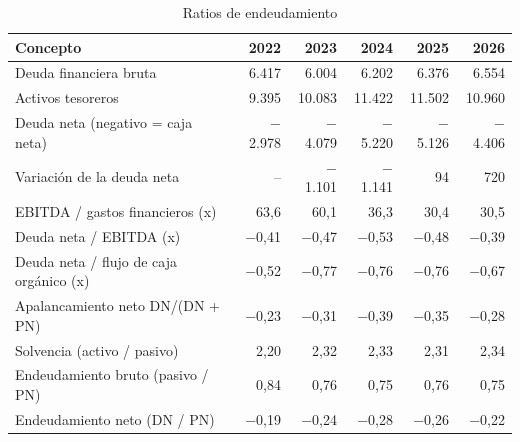 \documentclass[11pt,a4paper]{article}
\newcommand{\mn}{\ensuremath{-}}                 %
\begin{document}
\begin{table}[H]
\centering
\caption{Ratios de endeudamiento}
\label{tab:end}
\small
\begin{tabularx}{\textwidth}{@{}>{\raggedright\arraybackslash}p{6.3cm}RRRRR@{}}
\toprule
\color{navy}\textbf{Concepto} & \color{navy}\textbf{2022} & \color{navy}\textbf{2023} & \color{navy}\textbf{2024} & \color{navy}\textbf{2025} & \color{navy}\textbf{2026} \\
\midrule
Deuda financiera bruta & 6.417 & 6.004 & 6.202 & 6.376 & 6.554 \\
Activos tesoreros & 9.395 & 10.083 & 11.422 & 11.502 & 10.960 \\
Deuda neta (negativo = caja neta) & \mn2.978 & \mn4.079 & \mn5.220 & \mn5.126 & \mn4.406 \\
Variación de la deuda neta & -- & \mn1.101 & \mn1.141 & 94 & 720 \\
\midrule
EBITDA / gastos financieros (x) & 63,6 & 60,1 & 36,3 & 30,4 & 30,5 \\
Deuda neta / EBITDA (x) & \mn0,41 & \mn0,47 & \mn0,53 & \mn0,48 & \mn0,39 \\
Deuda neta / flujo de caja orgánico (x) & \mn0,52 & \mn0,77 & \mn0,76 & \mn0,76 & \mn0,67 \\
Apalancamiento neto DN/(DN + PN) & \mn0,23 & \mn0,31 & \mn0,39 & \mn0,35 & \mn0,28 \\
Solvencia (activo / pasivo) & 2,20 & 2,32 & 2,33 & 2,31 & 2,34 \\
Endeudamiento bruto (pasivo / PN) & 0,84 & 0,76 & 0,75 & 0,76 & 0,75 \\
Endeudamiento neto (DN / PN) & \mn0,19 & \mn0,24 & \mn0,28 & \mn0,26 & \mn0,22 \\
\bottomrule
\end{tabularx}
\end{table}
\end{document}
